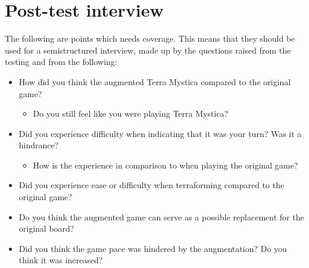 \section{Post-test interview}
The following are points which needs coverage. This means that they should be used for a semistructured interview, made up by the questions raised from the testing and from the following:
\begin{itemize}
\item How did you think the augmented Terra Mystica compared to the original game?
\begin{itemize}
\item Do you still feel like you were playing Terra Mystica?
\end{itemize}
\item Did you experience difficulty when indicating that it was your turn? Was it a hindrance? 
\begin{itemize}
\item How is the experience in comparison to when playing the original game?
\end{itemize}
\item Did you experience ease or difficulty when terraforming compared to the original game?
\item Do you think the augmented game can serve as a possible replacement for the original board?
\item Did you think the game pace was hindered by the augmentation? Do you think it was increased?
\end{itemize}
